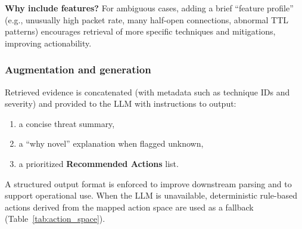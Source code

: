 \documentclass[conference]{IEEEtran}
\begin{document}
\textbf{Why include features?} For ambiguous cases, adding a brief ``feature profile'' (e.g., unusually high packet rate, many half-open connections, abnormal TTL patterns) encourages retrieval of more specific techniques and mitigations, improving actionability.

\subsubsection{Augmentation and generation}
Retrieved evidence is concatenated (with metadata such as technique IDs and severity) and provided to the LLM with instructions to output:
\begin{enumerate}
  \item a concise threat summary,
  \item a ``why novel'' explanation when flagged unknown,
  \item a prioritized \textbf{Recommended Actions} list.
\end{enumerate}
A structured output format is enforced to improve downstream parsing and to support operational use. When the LLM is unavailable, deterministic rule-based actions derived from the mapped action space are used as a fallback (Table~\ref{tab:action_space}).

\end{document}
